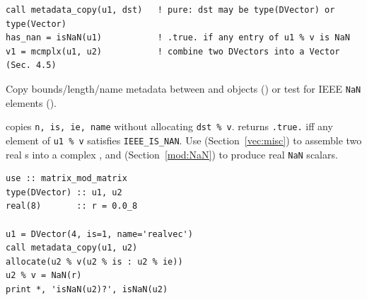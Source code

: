 \lstset{language=[95]Fortran}
\begin{lstlisting}
call metadata_copy(u1, dst)   ! pure: dst may be type(DVector) or type(Vector)
has_nan = isNaN(u1)           ! .true. if any entry of u1 % v is NaN
v1 = mcmplx(u1, u2)           ! combine two DVectors into a Vector (Sec. 4.5)
\end{lstlisting}

Copy bounds/length/name metadata between  and  objects () or test for IEEE \texttt{NaN} elements ().

 copies \texttt{n, is, ie, name} without allocating \texttt{dst \% v}.  returns \texttt{.true.} iff any element of \texttt{u1 \% v} satisfies \texttt{IEEE\_IS\_NAN}. Use  (Section~\ref{vec:misc}) to assemble two real s into a complex , and  (Section~\ref{mod:NaN}) to produce real \texttt{NaN} scalars.

\begin{description}[leftmargin=2.2cm, style=nextline]
\end{description}

\lstset{language=[95]Fortran}
\begin{lstlisting}
use :: matrix_mod_matrix
type(DVector) :: u1, u2
real(8)       :: r = 0.0_8

u1 = DVector(4, is=1, name='realvec')
call metadata_copy(u1, u2)
allocate(u2 % v(u2 % is : u2 % ie))
u2 % v = NaN(r)
print *, 'isNaN(u2)?', isNaN(u2)
\end{lstlisting}
